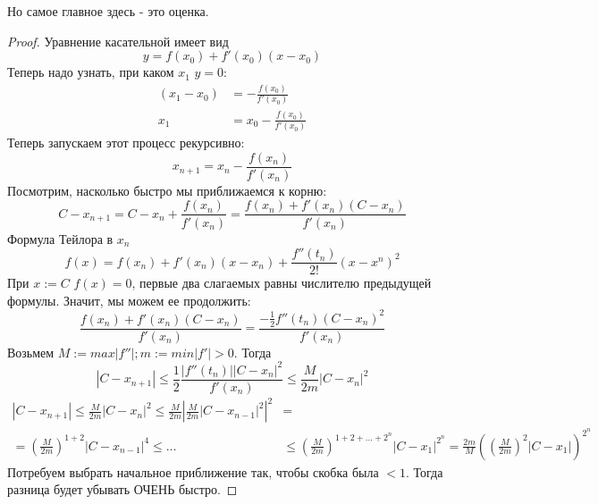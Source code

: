 \documentclass{article}
\begin{document}
Но самое главное здесь - это оценка.
\begin{proof}
Уравнение касательной имеет вид
\begin{equation*}
y = f(x_0) + f'(x_0)(x-x_0)
\end{equation*}
Теперь надо узнать, при каком $x_1$ $y = 0$:
\begin{align*}
(x_1 - x_0) &= -\frac{f(x_0)} {f'(x_0)}\\
x_1 &= x_0 - \frac{f(x_0)}{f'(x_0)}
\end{align*}
Теперь запускаем этот процесс рекурсивно:
\begin{equation*}
x_{n+1} = x_n - \frac{f(x_n)} {f'(x_n)}
\end{equation*}
Посмотрим, насколько быстро мы приближаемся к корню:
\begin{equation*}
C - x_{n+1} = C - x_n + \frac{f(x_n)} {f'(x_n)} = \frac{f(x_n) + f'(x_n)(C - x_n)} {f'(x_n)}
\end{equation*}
Формула Тейлора в $x_n$
\begin{equation*}
f(x) = f(x_n) + f'(x_n)(x - x_n) + \frac{f''(t_n)} {2!} (x - x^n)^2
\end{equation*}
При $x:= C$ $f(x) = 0$, первые два слагаемых равны числителю предыдущей формулы. Значит, мы можем ее продолжить:
\begin{equation*}
\frac{f(x_n) + f'(x_n)(C - x_n)} {f'(x_n)} = \frac{-\frac{1} {2} f''(t_n)(C - x_n)^2}{f'(x_n)}
\end{equation*}
Возьмем $M:= max|f''|; m:= min|f'| >0$. Тогда
\begin{equation*}
|C - x_{n+1}| \leq \frac{1} {2} \frac{|f''(t_n)||C -x_n|^2} {f'(x_n)} \leq \frac{M} {2m} |C - x_n|^2
\end{equation*}
\begin{align*}
|C - x_{n+1}| \leq \frac{M} {2m} |C - x_n|^2 \leq \frac{M}{2m}\left|\frac{M}{2m}|C - x_{n-1}|^2\right|^2 &=\\
= \left(\frac{M}{2m}\right)^{1 + 2} |C - x_{n-1}|^4 \leq \ldots &\leq \left(\frac{M}{2m}\right)^{1 + 2 + \ldots + 2^n} |C - x_1|^{2^n} = \frac{2m} {M} \left(\left(\frac{M}{2m}\right)^2|C - x_1|\right)^{2^n}
\end{align*}
Потребуем выбрать начальное приближение так, чтобы скобка была $<1$. Тогда  разница будет убывать ОЧЕНЬ быстро.
\end{proof}
\end{document}
